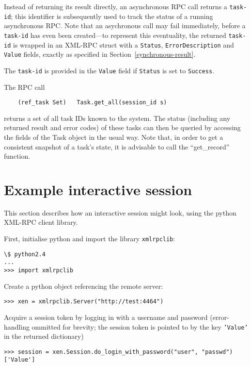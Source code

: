 Instead of returning its result directly, an asynchronous RPC call
returns a {\tt task-id}; this identifier is subsequently used
to track the status of a running asynchronous RPC. Note that an asychronous
call may fail immediately, before a {\tt task-id} has even been created---to
represent this eventuality, the returned {\tt task-id}
is wrapped in an XML-RPC struct with a {\tt Status}, {\tt ErrorDescription} and
{\tt Value} fields, exactly as specified in Section~\ref{synchronous-result}.

The {\tt task-id} is provided in the {\tt Value} field if {\tt Status} is set to
{\tt Success}.

The RPC call
\begin{verbatim}
    (ref_task Set)   Task.get_all(session_id s)
\end{verbatim} 
returns a set of all task IDs known to the system. The status (including any
returned result and error codes) of these tasks
can then be queried by accessing the fields of the Task object in the usual way. 
Note that, in order to get a consistent snapshot of a task's state, it is advisable to call the ``get\_record'' function.

\section{Example interactive session}

This section describes how an interactive session might look, using the python
XML-RPC client library. 

First, initialise python and import the library {\tt xmlrpclib}:

\begin{verbatim}
\$ python2.4
...
>>> import xmlrpclib
\end{verbatim}

Create a python object referencing the remote server:

\begin{verbatim}
>>> xen = xmlrpclib.Server("http://test:4464")
\end{verbatim}

Acquire a session token by logging in with a username and password (error-handling ommitted for brevity; the session token is pointed to by the key {\tt 'Value'} in the returned dictionary)

\begin{verbatim}
>>> session = xen.Session.do_login_with_password("user", "passwd")['Value']
\end{verbatim}

